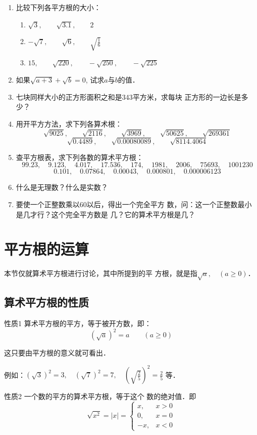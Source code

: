 \begin{enumerate}
\item 比较下列各平方根的大小：
\begin{enumerate}
    \item $\sqrt{3},\qquad \sqrt{3.1},\qquad 2$
    \item $-\sqrt{7},\qquad \sqrt{6},\qquad \sqrt{\frac{1}{6}}$
    \item $15,\qquad \sqrt{220},\qquad -\sqrt{250},\qquad -\sqrt{225}$
\end{enumerate}

\item 如果$\sqrt{a+3}+\sqrt{b}=0$, 试求$a$与$b$的值．
\item 七块同样大小的正方形面积之和是343平方米，求每块
正方形的一边长是多少？
\item 用开平方方法，求下列各算术根：
\[\sqrt{9025},\qquad \sqrt{2116},\qquad \sqrt{3969},\qquad \sqrt{50625},\qquad \sqrt{269361}\]
\[\sqrt{0.4489},\qquad \sqrt{0.00080089},\qquad \sqrt{8114.4064}\]
\item 查平方根表，求下列各数的算术平方根：
\[99.23,\quad 9.123,\quad 4.017,\quad 17.536,\quad 174,\quad 1981,\quad 2006,\quad 
75693,\quad 1001230\]
\[0.101,\quad 0.07864,\quad 0.00043,\quad 0.000801,\quad 
0.000006123\]
\item 什么是无理数？什么是实数？
\item 要使一个正整数乘以60以后，得出一个完全平方
数，问：这一个正整数最小是几才行？这个完全平方数是
几？它的算术平方根是几？
\end{enumerate}

\section{平方根的运算}
本节仅就算术平方根进行讨论，其中所提到的平
方根，就是指$\sqrt{a},\quad (a\ge 0)$．

\subsection{算术平方根的性质}

\begin{blk}{性质1}
    算术平方根的平方，等于被开方数，即：
$$\left(\sqrt{a}\right)^2=a\qquad (a\ge 0)$$
\end{blk}

这只要由平方根的意义就可看出．

例如：$(\sqrt{3})^2=3,\quad (\sqrt{7})^2=7,\quad \left(\sqrt{\frac{2}{5}}\right)^2=\frac{2}{5}$
等．

\begin{blk}{性质2}
    一个数的平方的算术平方根，等于这个
数的绝对值．即
\[\sqrt{x^2}=|x|=\begin{cases}
    x,& x>0\\
    0, &x=0\\
    -x, & x<0
\end{cases}\]
\end{blk}

